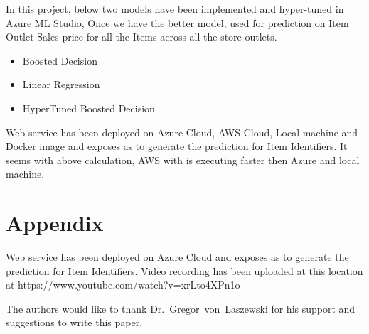 In this project, below two models have been implemented and 
hyper-tuned in Azure ML Studio, Once we have the better model, used for 
prediction on Item Outlet Sales price for all the Items 
across all the store outlets.
\begin{itemize}
\item Boosted Decision
\item Linear Regression
\item HyperTuned Boosted Decision
\end{itemize}
Web service has been deployed on Azure Cloud, AWS Cloud, Local machine 
and Docker image and exposes 
as to generate the prediction for Item Identifiers. It seems with above 
calculation, AWS with is executing faster then Azure and local machine.

\section{Appendix}

Web service has been deployed on Azure Cloud and exposes as to generate 
the prediction for Item Identifiers.
Video recording has been uploaded at this location at
https://www.youtube.com/watch?v=xrLto4XPn1o


\begin{acks}

  The authors would like to thank Dr.~Gregor~von~Laszewski for his
  support and suggestions to write this paper.

\end{acks}


 
